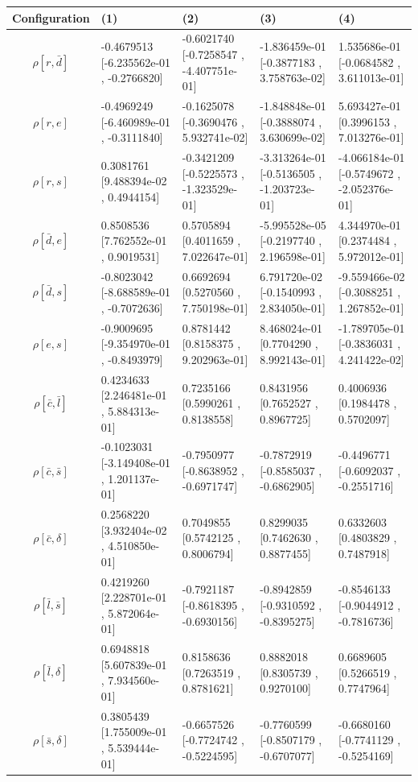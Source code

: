 \begin{center}
\begin{tabular}{|c|p{3.7cm}|p{3.7cm}|p{3.7cm}|p{3.7cm}|}
\hline
Configuration&(1)&(2)&(3)&(4)\\\hline
$\rho[r,\bar{d}]$&-0.4679513 [-6.235562e-01 , -0.2766820]&-0.6021740 [-0.7258547 , -4.407751e-01]&-1.836459e-01 [-0.3877183 , 3.758763e-02]&1.535686e-01 [-0.0684582 , 3.611013e-01]\\
$\rho[r,e]$&-0.4969249 [-6.460989e-01 , -0.3111840]&-0.1625078 [-0.3690476 , 5.932741e-02]&-1.848848e-01 [-0.3888074 , 3.630699e-02]&5.693427e-01 [0.3996153 , 7.013276e-01]\\
$\rho[r,s]$&0.3081761 [9.488394e-02 , 0.4944154]&-0.3421209 [-0.5225573 , -1.323529e-01]&-3.313264e-01 [-0.5136505 , -1.203723e-01]&-4.066184e-01 [-0.5749672 , -2.052376e-01]\\
$\rho[\bar{d},e]$&0.8508536 [7.762552e-01 , 0.9019531]&0.5705894 [0.4011659 , 7.022647e-01]&-5.995528e-05 [-0.2197740 , 2.196598e-01]&4.344970e-01 [0.2374484 , 5.972012e-01]\\
$\rho[\bar{d},s]$&-0.8023042 [-8.688589e-01 , -0.7072636]&0.6692694 [0.5270560 , 7.750198e-01]&6.791720e-02 [-0.1540993 , 2.834050e-01]&-9.559466e-02 [-0.3088251 , 1.267852e-01]\\
$\rho[e,s]$&-0.9009695 [-9.354970e-01 , -0.8493979]&0.8781442 [0.8158375 , 9.202963e-01]&8.468024e-01 [0.7704290 , 8.992143e-01]&-1.789705e-01 [-0.3836031 , 4.241422e-02]\\\hline
$\rho[\bar{c},\bar{l}]$&0.4234633 [2.246481e-01 , 5.884313e-01]&0.7235166 [0.5990261 , 0.8138558]&0.8431956 [0.7652527 , 0.8967725]&0.4006936 [0.1984478 , 0.5702097]\\
$\rho[\bar{c},\bar{s}]$&-0.1023031 [-3.149408e-01 , 1.201137e-01]&-0.7950977 [-0.8638952 , -0.6971747]&-0.7872919 [-0.8585037 , -0.6862905]&-0.4496771 [-0.6092037 , -0.2551716]\\
$\rho[\bar{c},\delta]$&0.2568220 [3.932404e-02 , 4.510850e-01]&0.7049855 [0.5742125 , 0.8006794]&0.8299035 [0.7462630 , 0.8877455]&0.6332603 [0.4803829 , 0.7487918]\\
$\rho[\bar{l},\bar{s}]$&0.4219260 [2.228701e-01 , 5.872064e-01]&-0.7921187 [-0.8618395 , -0.6930156]&-0.8942859 [-0.9310592 , -0.8395275]&-0.8546133 [-0.9044912 , -0.7816736]\\
$\rho[\bar{l},\delta]$&0.6948818 [5.607839e-01 , 7.934560e-01]&0.8158636 [0.7263519 , 0.8781621]&0.8882018 [0.8305739 , 0.9270100]&0.6689605 [0.5266519 , 0.7747964]\\
$\rho[\bar{s},\delta]$&0.3805439 [1.755009e-01 , 5.539444e-01]&-0.6657526 [-0.7724742 , -0.5224595]&-0.7760599 [-0.8507179 , -0.6707077]&-0.6680160 [-0.7741129 , -0.5254169]\\\hline
\end{tabular}



\end{center}
